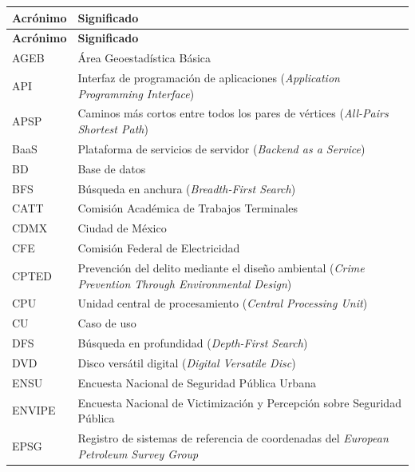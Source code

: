 
\begin{longtable}{@{}L{2.4cm}p{\dimexpr\textwidth-2.4cm-2\tabcolsep\relax}@{}}
\toprule
\textbf{Acrónimo} & \textbf{Significado} \\
\midrule
\endfirsthead
\toprule
\textbf{Acrónimo} & \textbf{Significado} \\
\midrule
\endhead
\bottomrule
\endfoot
AGEB & Área Geoestadística Básica \\
API & Interfaz de programación de aplicaciones (\textit{Application Programming Interface}) \\
APSP & Caminos más cortos entre todos los pares de vértices (\textit{All-Pairs Shortest Path}) \\
BaaS & Plataforma de servicios de servidor (\textit{Backend as a Service}) \\
BD & Base de datos \\
BFS & Búsqueda en anchura (\textit{Breadth-First Search}) \\
CATT & Comisión Académica de Trabajos Terminales \\
CDMX & Ciudad de México \\
CFE & Comisión Federal de Electricidad \\
CPTED & Prevención del delito mediante el diseño ambiental (\textit{Crime Prevention Through Environmental Design}) \\
CPU & Unidad central de procesamiento (\textit{Central Processing Unit}) \\
CU & Caso de uso \\
DFS & Búsqueda en profundidad (\textit{Depth-First Search}) \\
DVD & Disco versátil digital (\textit{Digital Versatile Disc}) \\
ENSU & Encuesta Nacional de Seguridad Pública Urbana \\
ENVIPE & Encuesta Nacional de Victimización y Percepción sobre Seguridad Pública \\
EPSG & Registro de sistemas de referencia de coordenadas del \textit{European Petroleum Survey Group} \\

\end{longtable}
